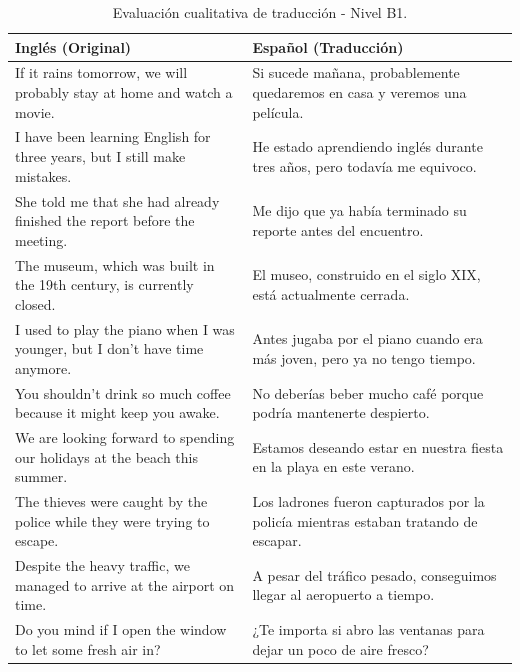 \begin{table}[t]
    \centering
    \begin{tabular}{p{} p{}}
        \toprule
        \textbf{Inglés (Original)} & \textbf{Español (Traducción)} \\
        \midrule
        If it rains tomorrow, we will probably stay at home and watch a movie. & Si sucede mañana, probablemente quedaremos en casa y veremos una película. \\
        I have been learning English for three years, but I still make mistakes. & He estado aprendiendo inglés durante tres años, pero todavía me equivoco. \\
        She told me that she had already finished the report before the meeting. & Me dijo que ya había terminado su reporte antes del encuentro. \\
        The museum, which was built in the 19th century, is currently closed. & El museo, construido en el siglo XIX, está actualmente cerrada. \\
        I used to play the piano when I was younger, but I don't have time anymore. & Antes jugaba por el piano cuando era más joven, pero ya no tengo tiempo. \\
        You shouldn't drink so much coffee because it might keep you awake. & No deberías beber mucho café porque podría mantenerte despierto. \\
        We are looking forward to spending our holidays at the beach this summer. & Estamos deseando estar en nuestra fiesta en la playa en este verano. \\
        The thieves were caught by the police while they were trying to escape. & Los ladrones fueron capturados por la policía mientras estaban tratando de escapar. \\
        Despite the heavy traffic, we managed to arrive at the airport on time. & A pesar del tráfico pesado, conseguimos llegar al aeropuerto a tiempo. \\
        Do you mind if I open the window to let some fresh air in? & ¿Te importa si abro las ventanas para dejar un poco de aire fresco? \\
        \bottomrule
    \end{tabular}
    \caption{Evaluación cualitativa de traducción - Nivel B1.}
    \label{tab:evaluacion_B1}
\end{table}

